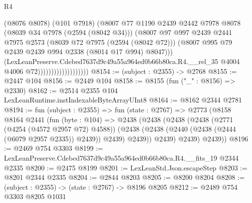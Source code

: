 \begin{lexlean}{R4}
\begin{coremodule}
                                        (@8076 @8078)
                                        (@101 @7918)
                                        (@8007
                                          @77
                                          @1190
                                          @2439
                                          @2442
                                          @7978
                                          @8078
                                          (@8039 @34 @7978 (@2594 (@8042 @34)))
                                          (@8007
                                            @97
                                            @997
                                            @2439
                                            @2441
                                            @7975
                                            @2573
                                            (@8039 @72 @7975 (@2594 (@8042 @72)))
                                            (@8007
                                              @995
                                              @79
                                              @2439
                                              @2439
                                              @994
                                              @2338
                                              (@8014 @17 @994)
                                              @8047)))
                                        (LexLeanPreserve.Cdebed7637d9c49a55a964ed0b66b80ca.R4.__rel_35
                                          @4004
                                          @4006
                                          @72)))))))))))))))))))
@8154 := (subject : @2355) -> @2768
@8155 := @2447 @104
@8156 := @2449 @104
@8158 := @8155 (fun ("_" : @8156) => @2330)
@8162 := @2514 @2355 @104 LexLeanRuntime.instIndexableByteArrayUInt8
@8164 := @8162 @2344 @2781
@8194 := fun (subject : @2355) =>
  fun (state : @2767) =>
  @2773
    (@8158
      @8164
      @2441
      (fun (byte : @104) =>
      @2438
        (@2438
          (@2438
            (@2438
              (@2771 (@4254 (@4572 @2957 @72) @4588))
              (@2438 (@2438 (@2440 (@2438 (@2444 (@6079 @2957 @2335)) @2439)) @2439) @2439))
            @2439)
          @2439)
        @2439))
@8196 := @2469 @754 @3303
@8199 := LexLeanPreserve.Cdebed7637d9c49a55a964ed0b66b80ca.R4.__fits_19 @2344 @2335
@8200 := @2475 @8199
@8201 := LexLeanStd.Json.escapeStep
@8203 := @8201 @2344 @2335
@8204 := @2844 @8203
@8205 := @8200 @8204
@8208 := (subject : @2355) -> (state : @2767) -> @8196 @8205
@8212 := @2489 @754 @3303 @8205 @1031

\end{coremodule}
\end{lexlean}
